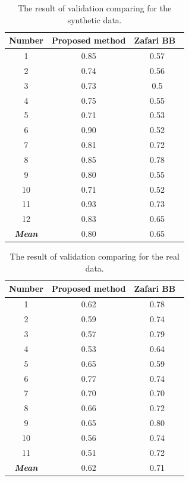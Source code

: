 \documentclass{lutmscthesis}[2010/09/22]
\begin{document}
\begin{table}[hpt]
\begin{center}
\caption{The result of validation comparing for the synthetic data.\label{tab:syndata}}
\begin{tabular}{ |c||c|c|  }
 \hline
 Number & Proposed method & Zafari BB~\cite{zafari-bb}\\
 \hline
 1   &  0.85&  0.57\\
 2   &  0.74&  0.56\\
 3   &  0.73&  0.5\\
 4   &  0.75&  0.55\\
 5   &  0.71&  0.53\\
 6   &  0.90&  0.52\\
 7   &  0.81&  0.72\\
 8   &  0.85&  0.78\\
 9   &  0.80&  0.55\\
 10  &  0.71&  0.52\\
 11  &  0.93&  0.73\\
 12  &  0.83&  0.65\\
 \hline
 \textbf{\textit{Mean}} & 0.80 & 0.65 \\
 \hline
\end{tabular}
\end{center}
\end{table}


\begin{table}[hpt]
\begin{center}
\caption{The result of validation comparing for the real data.\label{tab:realdata}}
\begin{tabular}{ |c||c|c|  }

 \hline
 Number & Proposed method & Zafari BB~\cite{zafari-bb}\\
 \hline
 1   &  0.62&  0.78\\
 2   &  0.59&  0.74\\
 3   &  0.57&  0.79\\
 4   &  0.53&  0.64\\
 5   &  0.65&  0.59\\
 6   &  0.77&  0.74\\
 7   &  0.70&  0.70\\
 8   &  0.66&  0.72\\
 9   &  0.65&  0.80\\
 10  &  0.56&  0.74\\
 11  &  0.51&  0.72\\
 \hline
 \textbf{\textit{Mean}} & 0.62 & 0.71\\
 \hline
\end{tabular}
\end{center}
\end{table}
\end{document}
